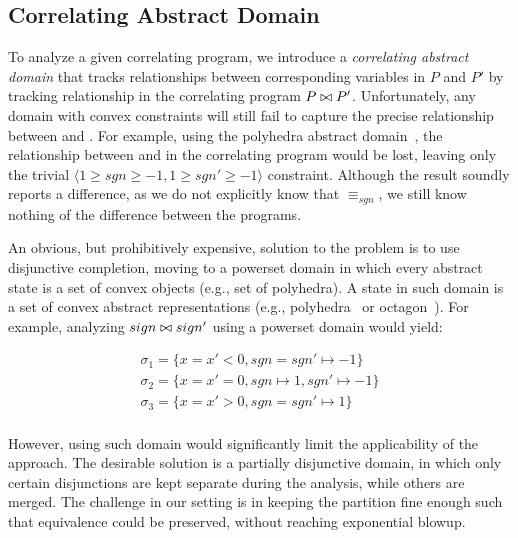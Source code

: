 \subsection{Correlating Abstract Domain}
To analyze a given correlating program, we introduce a \emph{correlating abstract domain} that tracks relationships between corresponding variables in $P$ and $P'$ by tracking relationship in the correlating program $P \bowtie P'$. Unfortunately, any domain with convex constraints will still fail to capture the precise relationship between  and . For example, using the polyhedra abstract domain~\cite{CousotHalbwachs78}, the relationship between  and  in the correlating program would be lost, leaving only the trivial $\langle 1 \geq sgn \geq -1, 1 \geq sgn' \geq -1 \rangle$ constraint. Although the result soundly reports a difference, as we do not explicitly know that $\equiv_{sgn}$, we still know nothing of the difference between the programs.

An obvious, but prohibitively expensive, solution to the problem is to use disjunctive completion, moving to a powerset domain in which every abstract state is a set of convex objects (e.g., set of polyhedra).
A state in such domain is a set of convex abstract representations (e.g., polyhedra~\cite{CousotHalbwachs78} or octagon~\cite{Mine2006}). For example, analyzing $sign \bowtie sign'$ using a powerset domain would yield:

{\footnotesize
\[
\begin{array}{c}
\sigma_1 = \{x = x' < 0, sgn = sgn' \mapsto -1\}\\
\sigma_2 = \{x = x' = 0, sgn \mapsto 1, sgn' \mapsto -1\}\\
\sigma_3 = \{x = x' > 0, sgn = sgn' \mapsto 1\}\\
\end{array}
\]
}

However, using such domain would significantly limit the applicability of the approach. The desirable solution is a partially disjunctive domain, in which only certain disjunctions are kept separate during the analysis, while others are merged. The challenge in our setting is in keeping the partition fine enough such that equivalence could be preserved, without reaching exponential blowup.

